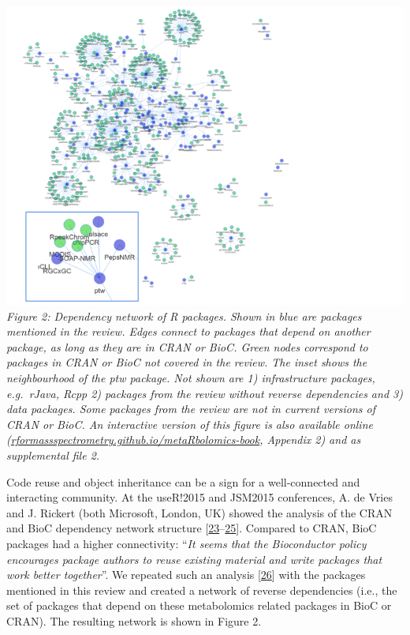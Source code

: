 \documentclass[]{article}
\begin{document}
\includegraphics{figures/Figure 2.png}
\emph{Figure 2: Dependency network of R packages. Shown in blue are packages mentioned in the review. Edges connect to packages that depend on another package, as long as they are in CRAN or BioC. Green nodes correspond to packages in CRAN or BioC not covered in the review. The inset shows the neighbourhood of the ptw package. Not shown are 1) infrastructure packages, e.g.~rJava, Rcpp 2) packages from the review without reverse dependencies and 3) data packages. Some packages from the review are not in current versions of CRAN or BioC. An interactive version of this figure is also available online (\href{https://rformassspectrometry.github.io/metaRbolomics-book/}{rformassspectrometry.github.io/metaRbolomics-book}, Appendix 2) and as supplemental file 2.}

Code reuse and object inheritance can be a sign for a well-connected and interacting community. At the useR!2015 and JSM2015 conferences, A. de Vries and J. Rickert (both Microsoft, London, UK) showed the analysis of the CRAN and BioC dependency network structure {[}\protect\hyperlink{ref-devries_website_2015b}{23}--\protect\hyperlink{ref-devries_website_2015}{25}{]}. Compared to CRAN, BioC packages had a higher connectivity: ``\emph{It seems that the Bioconductor policy encourages package authors to reuse existing material and write packages that work better together}''. We repeated such an analysis {[}\protect\hyperlink{ref-neumann_website_2019}{26}{]} with the packages mentioned in this review and created a network of reverse dependencies (i.e., the set of packages that depend on these metabolomics related packages in BioC or CRAN). The resulting network is shown in Figure 2.
\end{document}
